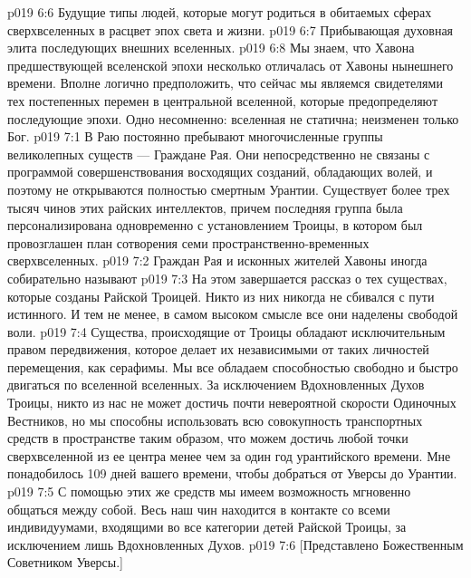 \vs p019 6:6 \pc {}\bibnobreakspace Будущие типы людей, которые могут родиться в обитаемых сферах сверхвселенных в расцвет эпох света и жизни.
\vs p019 6:7 \bibnobreakspace Прибывающая духовная элита последующих внешних вселенных.
\vs p019 6:8 Мы знаем, что Хавона предшествующей вселенской эпохи несколько отличалась от Хавоны нынешнего времени. Вполне логично предположить, что сейчас мы являемся свидетелями тех постепенных перемен в центральной вселенной, которые предопределяют последующие эпохи. Одно несомненно: вселенная не статична; неизменен только Бог.
\vs p019 7:1 В Раю постоянно пребывают многочисленные группы великолепных существ --- Граждане Рая. Они непосредственно не связаны с программой совершенствования восходящих созданий, обладающих волей, и поэтому не открываются полностью смертным Урантии. Существует более трех тысяч чинов этих райских интеллектов, причем последняя группа была персонализирована одновременно с установлением Троицы, в котором был провозглашен план сотворения семи пространственно\hyp{}временных сверхвселенных.
\vs p019 7:2 \pc Граждан Рая и исконных жителей Хавоны иногда собирательно называют 
\vs p019 7:3 \pc На этом завершается рассказ о тех существах, которые созданы Райской Троицей. Никто из них никогда не сбивался с пути истинного. И тем не менее, в самом высоком смысле все они наделены свободой воли.
\vs p019 7:4 Существа, происходящие от Троицы обладают исключительным правом передвижения, которое делает их независимыми от таких личностей перемещения, как серафимы. Мы все обладаем способностью свободно и быстро двигаться по вселенной вселенных. За исключением Вдохновленных Духов Троицы, никто из нас не может достичь почти невероятной скорости Одиночных Вестников, но мы способны использовать всю совокупность транспортных средств в пространстве таким образом, что можем достичь любой точки сверхвселенной из ее центра менее чем за один год урантийского времени. Мне понадобилось 109 дней вашего времени, чтобы добраться от Уверсы до Урантии.
\vs p019 7:5 С помощью этих же средств мы имеем возможность мгновенно общаться между собой. Весь наш чин находится в контакте со всеми индивидуумами, входящими во все категории детей Райской Троицы, за исключением лишь Вдохновленных Духов.
\vsetoff
\vs p019 7:6 [Представлено Божественным Советником Уверсы.]
